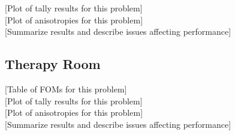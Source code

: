 [Plot of tally results for this problem] \\

[Plot of anisotropies for this problem] \\

[Summarize results and describe issues affecting performance] \\

\subsection{Therapy Room}
\label{subsec:resultstherapy}
[Table of FOMs for this problem] \\

[Plot of tally results for this problem] \\

[Plot of anisotropies for this problem] \\

[Summarize results and describe issues affecting performance] \\

